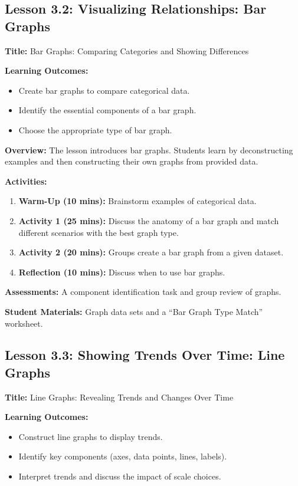 \documentclass{tufte-book}
\begin{document}
\subsection{Lesson 3.2: Visualizing Relationships: Bar Graphs}
\textbf{Title:} Bar Graphs: Comparing Categories and Showing Differences

\medskip
\textbf{Learning Outcomes:}
\begin{itemize}[leftmargin=*, label={\textbullet}]
    \item Create bar graphs to compare categorical data.
    \item Identify the essential components of a bar graph.
    \item Choose the appropriate type of bar graph.
\end{itemize}

\medskip
\textbf{Overview:}  
The lesson introduces bar graphs. Students learn by deconstructing examples and then constructing their own graphs from provided data.

\medskip
\textbf{Activities:}
\begin{enumerate}[label=\arabic*.]
    \item \textbf{Warm-Up (10 mins):} Brainstorm examples of categorical data.
    \item \textbf{Activity 1 (25 mins):} Discuss the anatomy of a bar graph and match different scenarios with the best graph type.
    \item \textbf{Activity 2 (20 mins):} Groups create a bar graph from a given dataset.
    \item \textbf{Reflection (10 mins):} Discuss when to use bar graphs.
\end{enumerate}

\medskip
\textbf{Assessments:}  
A component identification task and group review of graphs.

\medskip
\textbf{Student Materials:}  
Graph data sets and a “Bar Graph Type Match” worksheet.

\subsection{Lesson 3.3: Showing Trends Over Time: Line Graphs}
\textbf{Title:} Line Graphs: Revealing Trends and Changes Over Time

\medskip
\textbf{Learning Outcomes:}
\begin{itemize}[leftmargin=*, label={\textbullet}]
    \item Construct line graphs to display trends.
    \item Identify key components (axes, data points, lines, labels).
    \item Interpret trends and discuss the impact of scale choices.
\end{itemize}
\end{document}
